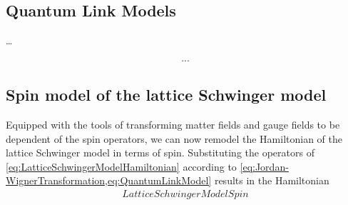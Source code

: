 \documentclass[../main.tex]{subfiles} %
\begin{document}
\subsection{Quantum Link Models}

\ldots

\begin{align} \label{eq:QuantumLinkModel}
    ...
\end{align}






\subsection{Spin model of the lattice Schwinger model}

Equipped with the tools of transforming matter fields and gauge fields to be dependent of the spin operators, we can now remodel the Hamiltonian of the lattice Schwinger model in terms of spin. Substituting the operators of \cref{eq:LatticeSchwingerModelHamiltonian} according to \cref{eq:Jordan-WignerTransformation,eq:QuantumLinkModel} results in the Hamiltonian
\begin{align} \label{eq:LatticeSchwingerModelHamiltonianSpin}
    LatticeSchwingerModelSpin
\end{align}





\printbibliography
\end{document}
